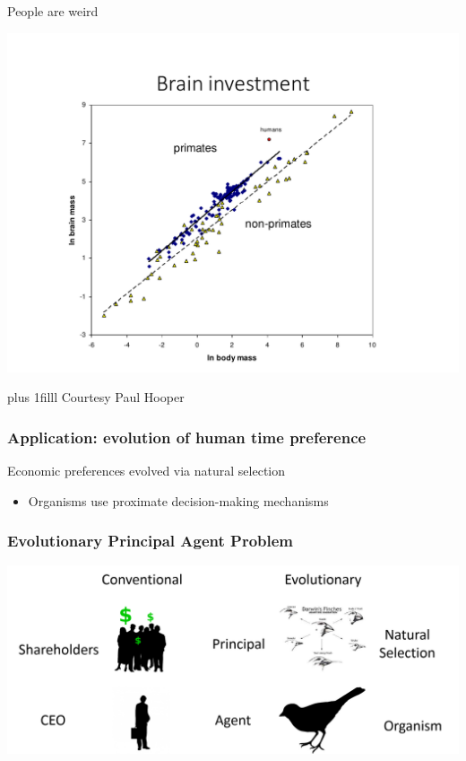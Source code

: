 \documentclass{beamer}
\newcommand{\btVFill}{\vskip0pt plus 1filll}
\begin{document}
\begin{frame}{People are weird}
  \begin{center}
    \includegraphics[page=2,width=.8\textwidth]{hooper_slides_condensed2.pdf}
  \end{center}
  \btVFill
  \small Courtesy Paul Hooper\normalsize
\end{frame}


\begin{frame}[t]
  \frametitle{Application: evolution of human time preference}
  \begin{block}{Economic preferences evolved via natural selection}
    \pause
    \begin{itemize}
      \item{Organisms use proximate decision-making mechanisms}
    \end{itemize}
  \end{block}
\end{frame}

\begin{frame}
  \frametitle{Evolutionary Principal Agent Problem}
  \begin{center}
    \includegraphics[width=1\textwidth]{PaP.png}
  \end{center}
\end{frame}
\end{document}
